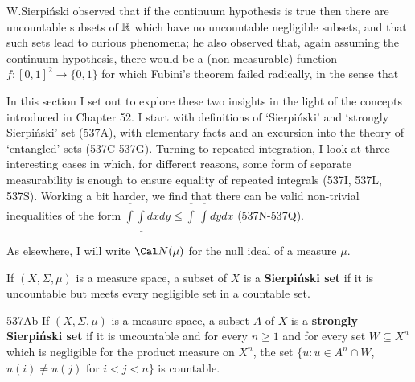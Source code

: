 
\def\shrplusN{\shr^+\mskip-4mu\Cal N}

\def\chaptername{Topologies and measures III}
\def\sectionname{Sierpi\'nski sets, shrinking numbers
and strong Fubini theorems}



W.Sierpi\'nski observed that if the continuum hypothesis is true then there
are uncountable subsets of $\Bbb R$ which have no uncountable negligible
subsets, and that such sets lead to curious phenomena;  he also observed
that, again assuming the continuum hypothesis, there would be a
(non-measurable) function $f:[0,1]^2\to\{0,1\}$ for which Fubini's theorem
failed radically, in the sense that


\noindent In this section I set out to explore these two insights in the
light of the concepts introduced in Chapter 52.   I start with
definitions of `Sierpi\'nski' and `strongly Sierpi\'nski' set (537A), with
elementary facts and an excursion into the theory of `entangled' sets
(537C-537G).  %
Turning to repeated integration, I look at three interesting cases in
which,
for different reasons, some form of separate measurability is enough
to ensure equality of repeated integrals (537I, 537L, 537S).
Working a bit harder, we find
that there can be valid non-trivial inequalities of the form
$\overline{\int}\underline{\int}dxdy
\le\overline{\int}\,\overline{\int}dydx$
(537N-537Q).  %

As elsewhere, I will write $\Cal N(\mu)$ for the null ideal of a measure
$\mu$.

If $(X,\Sigma,\mu)$ is a measure space, a subset of $X$ is a
{\bf Sierpi\'nski set} if it is uncountable but meets every negligible set
in a countable set.

\spheader 537Ab If $(X,\Sigma,\mu)$ is a measure space, a subset $A$ of $X$
is a
{\bf strongly Sierpi\'nski set} if it is uncountable and for every $n\ge 1$
and for every set $W\subseteq X^n$ which is negligible for
the product measure on $X^n$, the set
$\{u:u\in A^n\cap W$, $u(i)\ne u(j)$ for $i<j<n\}$ is countable.

